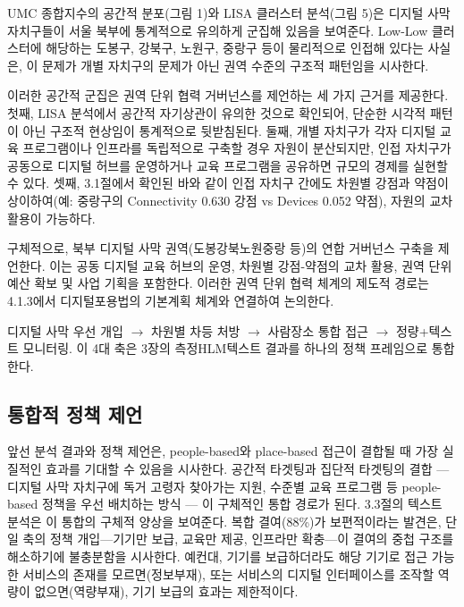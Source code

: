 UMC 종합지수의 공간적 분포(그림 1)와 LISA 클러스터 분석(그림 5)은 디지털 사막 자치구들이 서울 북부에 통계적으로 유의하게 군집해 있음을 보여준다. Low-Low 클러스터에 해당하는 도봉구, 강북구, 노원구, 중랑구 등이 물리적으로 인접해 있다는 사실은, 이 문제가 개별 자치구의 문제가 아닌 권역 수준의 구조적 패턴임을 시사한다.

이러한 공간적 군집은 권역 단위 협력 거버넌스를 제언하는 세 가지 근거를 제공한다. 첫째, LISA 분석에서 공간적 자기상관이 유의한 것으로 확인되어, 단순한 시각적 패턴이 아닌 구조적 현상임이 통계적으로 뒷받침된다. 둘째, 개별 자치구가 각자 디지털 교육 프로그램이나 인프라를 독립적으로 구축할 경우 자원이 분산되지만, 인접 자치구가 공동으로 디지털 허브를 운영하거나 교육 프로그램을 공유하면 규모의 경제를 실현할 수 있다. 셋째, 3.1절에서 확인된 바와 같이 인접 자치구 간에도 차원별 강점과 약점이 상이하여(예: 중랑구의 Connectivity 0.630 강점 vs Devices 0.052 약점), 자원의 교차 활용이 가능하다.

구체적으로, 북부 디지털 사막 권역(도봉\textperiodcentered{}강북\textperiodcentered{}노원\textperiodcentered{}중랑 등)의 연합 거버넌스 구축을 제언한다. 이는 공동 디지털 교육 허브의 운영, 차원별 강점-약점의 교차 활용, 권역 단위 예산 확보 및 사업 기획을 포함한다. 이러한 권역 단위 협력 체계의 제도적 경로는 4.1.3에서 디지털포용법의 기본계획 체계와 연결하여 논의한다.

\begin{keymsg}[title=정책 시사점 \textperiodcentered{} 장소민감적 처방의 4대 축]
디지털 사막 우선 개입 $\rightarrow$ 차원별 차등 처방 $\rightarrow$ 사람\textperiodcentered{}장소 통합 접근 $\rightarrow$ 정량+텍스트 모니터링. 이 4대 축은 3장의 측정\textperiodcentered{}HLM\textperiodcentered{}텍스트 결과를 하나의 정책 프레임으로 통합한다.
\end{keymsg}

\subsection{통합적 정책 제언}
\label{subsec:4-4}

앞선 분석 결과와 정책 제언은, people-based와 place-based 접근이 결합될 때 가장 실질적인 효과를 기대할 수 있음을 시사한다. 공간적 타겟팅과 집단적 타겟팅의 결합 --- 디지털 사막 자치구에 독거 고령자 찾아가는 지원, 수준별 교육 프로그램 등 people-based 정책을 우선 배치하는 방식 --- 이 구체적인 통합 경로가 된다. 3.3절의 텍스트 분석은 이 통합의 구체적 양상을 보여준다. 복합 결여(88\%)가 보편적이라는 발견은, 단일 축의 정책 개입---기기만 보급, 교육만 제공, 인프라만 확충---이 결여의 중첩 구조를 해소하기에 불충분함을 시사한다. 예컨대, 기기를 보급하더라도 해당 기기로 접근 가능한 서비스의 존재를 모르면(정보부재), 또는 서비스의 디지털 인터페이스를 조작할 역량이 없으면(역량부재), 기기 보급의 효과는 제한적이다.

